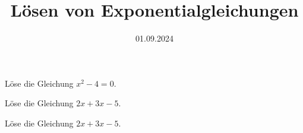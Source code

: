 \documentclass[points=left, 
solution
]{exam}
\date{01.09.2024}
\title{Lösen von Exponentialgleichungen}
\begin{document}
Löse die Gleichung \(x^2 - 4 = 0\). \\
\lipsum[1]

Löse die Gleichung \(2x + 3x - 5\).

Löse die Gleichung \(2x + 3x - 5\).
\thinkbubble[Test]


\totalpoints
\end{document}
